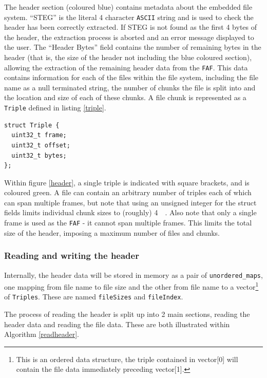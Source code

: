 \documentclass[paper=a4, fontsize=11pt,twoside]{scrartcl}
\numberwithin{table}{section}
\numberwithin{figure}{section}
\numberwithin{algorithm}{section}
\begin{document}
\noindent
The header section (coloured blue) contains metadata about the embedded file system. ``STEG'' is the literal 4 character \texttt{ASCII} string and is used to check the header has been correctly extracted. If STEG is not found as the first 4 bytes of the header, the extraction process is aborted and an error message displayed to the user. The ``Header Bytes'' field contains the number of remaining bytes in the header (that is, the size of the header not including the blue coloured section), allowing the extraction of the remaining header data from the \texttt{FAF}. This data contains information for each of the files within the file system, including the file name as a null terminated string, the number of chunks the file is split into and the location and size of each of these chunks. A file chunk is represented as a \texttt{Triple} defined in listing \ref{triple}.

\begin{lstlisting}[caption={Triple definition (\texttt{fs/stegfs.h:19})}, frame=single, label=triple]
struct Triple {
  uint32_t frame;
  uint32_t offset;
  uint32_t bytes;
};
\end{lstlisting}

\noindent
Within figure \ref{header}, a single triple is indicated with square brackets, and is coloured green. A file can contain an arbitrary number of triples each of which can span multiple frames, but note that using an unsigned integer for the struct fields limits individual chunk sizes to (roughly) \SI{4}{\giga\byte}. Also note that only a single frame is used as the \texttt{FAF} - it cannot span multiple frames. This limits the total size of the header, imposing a maximum number of files and chunks.

\subsubsection{Reading and writing the header}

Internally, the header data will be stored in memory as a pair of \texttt{unordered\_maps}, one mapping from file name to file size and the other from file name to a vector\footnote{This is an ordered data structure, the triple contained in vector[0] will contain the file data immediately preceding vector[1].} of \texttt{Triples}. These are named \texttt{fileSizes} and \texttt{fileIndex}.

The process of reading the header is split up into 2 main sections, reading the header data and reading the file data. These are both illustrated within Algorithm \ref{readheader}.
\end{document}
